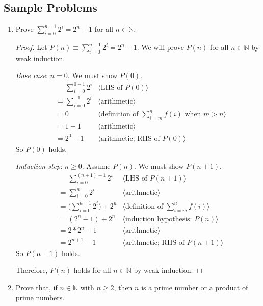 \documentclass[11pt,fleqn]{article}
\newcommand{\pnote}[1]{{\langle \text{#1} \rangle}}
\begin{document}
\subsection*{Sample Problems}

\begin{enumerate}

  \item Prove $\sum^{n-1}_{i=0}2^i = 2^n - 1$ for all $n \in
    \mathbb{N}$.

\begin{proof}
Let $P(n) \equiv \sum^{n-1}_{i=0}2^i = 2^n - 1$.  We will prove $P(n)$
for all $n \in \mathbb{N}$ by weak induction.

\medskip

\emph{Base case}: $n = 0$.  We must show $P(0)$.
\begin{align*}
  &\phantom{{}=} \sum_{i=0}^{0-1} 2^{i} & \pnote{LHS of $P(0)$}\\
  &= \sum^{-1}_{i = 0} 2^i  & \pnote{arithmetic}\\
  &= 0          & \pnote{definition of $\textstyle{\sum}_{i=m}^{n} f(i)$ when $m > n$}\\
  &= 1 - 1      & \pnote{arithmetic}\\
  &= 2^0 - 1    & \pnote{arithmetic; RHS of $P(0)$}
\end{align*}
So $P(0)$ holds.

\medskip

\emph{Induction step}: $n \ge 0$. Assume $P(n)$. We must show $P(n + 1)$.
\begin{align*}
  &\phantom{{}=} \sum_{i=0}^{(n + 1) - 1} 2^i   & \pnote{LHS of $P(n + 1)$}\\
  &= \sum_{i=0}^{n} 2^{i}       & \pnote{arithmetic}\\
  &= \big(\textstyle{\sum}_{i=0}^{n-1} 2^i\big) + 2^n & \pnote{definition of $\textstyle{\sum}_{i=m}^{n} f(i)$}\\
  &= (2^n - 1) + 2^n           & \pnote{induction hypothesis: $P(n)$}\\
  &= 2*2^n - 1                 & \pnote{arithmetic}\\
  &= 2^{n+1} - 1               & \pnote{arithmetic; RHS of $P(n + 1)$}
\end{align*}
So $P(n + 1)$ holds.

\medskip

Therefore, $P(n)$ holds for all $n \in \mathbb{N}$ by weak induction.
\end{proof}

  \item Prove that, if $n \in \mathbb{N}$ with $n \ge 2$, then $n$ is
    a prime number or a product of prime numbers.


\end{enumerate}
\end{document}
